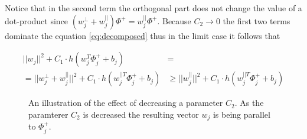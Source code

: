 \documentclass[table]{article} %
\begin{document}
	  	Notice that in the second term the orthogonal part does not change the value of a dot-product since $(w_j^{\perp}+w_j^{||})\Phi^+=w_j^{||}\Phi^+$. Because $C_2 \rightarrow 0$ the first two terms dominate the equation \eqref{eq:decomposed} thus in the limit case it follows that

		  	\begin{align}
                \nonumber
		  		||w_j||^2 +C_1 \cdot 
		        h
		        \left(
		        	w_j^T\Phi^+_j+b_j
		        \right)&=\\
		        =||w_j^{\perp}+w_j^{||}||^{2} +
		        C_1 \cdot h
		        \left(
		        	w_j^{||T}\Phi^+_j+b_j
		        \right)
		        &\geq
		        ||w_j^{||}||^2 +C_1 \cdot 
		        h
		        \left(
		        	w_j^{||T}\Phi^+_j+b_j
		        \right)
		       	\label{eq:bound} 
		  	\end{align}


			\begin{figure}[t]
			    \begin{center}
                    \hspace{20mm}
			    \caption{An illustration of the effect of decreasing a parameter $C_2$. As the paramterer $C_2$ is decreased the resulting vector $w_j$ is being parallel to $\Phi_j^+$.}
			    \label{fig:C2effect}
                \end{center}
			\end{figure}
\end{document}

